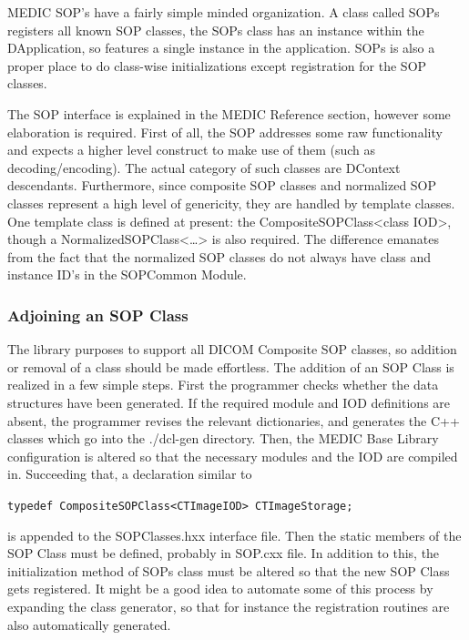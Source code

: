 \documentclass[a4paper,10pt]{article}
\begin{document}
MEDIC SOP{'}s have a fairly simple minded organization. A class called SOPs
registers all known SOP classes, the SOPs class has an instance within the
DApplication, so features a single instance in the application. SOPs is also
a proper place to do class-wise initializations except registration for the
SOP classes.



The SOP interface is explained in the MEDIC Reference section, however some
elaboration is required. First of all, the SOP addresses some raw
functionality and expects a higher level construct to make use of them (such
as decoding/encoding). The actual category of such classes are DContext
descendants. Furthermore, since composite SOP classes and normalized SOP
classes represent a high level of genericity, they are handled by template
classes. One template class is defined at present: the
CompositeSOPClass<class IOD>, though a NormalizedSOPClass<\unskip\ldots> is
also required. The difference emanates from the fact that the normalized SOP
classes do not always have class and instance ID{'}s in the SOPCommon
Module.



\subsubsection{Adjoining an SOP Class}

The library purposes to support all DICOM Composite SOP classes, so addition
or removal of a class should be made effortless. The addition of an SOP
Class is realized in a few simple steps. First the programmer checks whether
the data structures have been generated. If the required module and IOD
definitions are absent, the programmer revises the relevant dictionaries,
and generates the C++ classes which go into the ./dcl-gen directory. Then,
the MEDIC Base Library configuration is altered so that the necessary modules
and the IOD are compiled in. Succeeding that, a declaration similar to


\verb+typedef CompositeSOPClass<CTImageIOD> CTImageStorage;+


is appended to the SOPClasses.hxx interface file. Then the static members of
the SOP Class must be defined, probably in SOP.cxx file. In addition to
this, the initialization method of SOPs class must be altered so that the
new SOP Class gets registered. It might be a good idea to automate some of
this process by expanding the class generator, so that for instance the
registration routines are also automatically generated.
\end{document}
